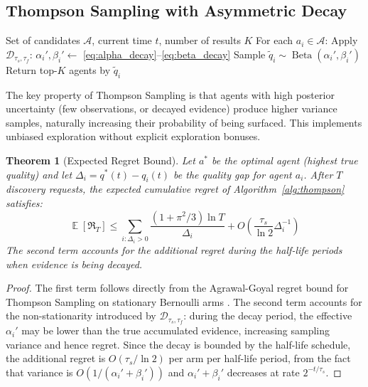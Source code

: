 \documentclass[conference]{IEEEtran}
\newtheorem{theorem}{Theorem}
\DeclareMathOperator{\E}{\mathbb{E}}
\DeclareMathOperator{\Beta}{\mathrm{Beta}}
\begin{document}
\subsection{Thompson Sampling with Asymmetric Decay}

\begin{algorithm}
\caption{ArohaRep Discovery Ranking}
\label{alg:thompson}
\begin{algorithmic}[1]
\Require Set of candidates $\mathcal{A}$, current time $t$,
         number of results $K$
\State For each $a_i \in \mathcal{A}$:
\State \quad Apply $\mathcal{D}_{\tau_s,\tau_f}$:
       $\alpha_i', \beta_i' \leftarrow$
       \eqref{eq:alpha_decay}--\eqref{eq:beta_decay}
\State \quad Sample $\tilde{q}_i \sim \Beta(\alpha_i', \beta_i')$
\State Return top-$K$ agents by $\tilde{q}_i$
\end{algorithmic}
\end{algorithm}

The key property of Thompson Sampling is that agents with
high posterior uncertainty (few observations, or decayed
evidence) produce higher variance samples, naturally
increasing their probability of being surfaced. This
implements unbiased exploration without explicit exploration
bonuses.

\begin{theorem}[Expected Regret Bound]
\label{thm:regret}
Let $a^*$ be the optimal agent (highest true quality) and
let $\Delta_i = q^*(t) - q_i(t)$ be the quality gap for
agent $a_i$. After $T$ discovery requests, the expected
cumulative regret of Algorithm~\ref{alg:thompson} satisfies:
\begin{equation}
  \E\!\left[\mathfrak{R}_T\right] \leq
    \sum_{i: \Delta_i > 0}
    \frac{(1 + \pi^2/3)\ln T}{\Delta_i}
    + O\!\left(\frac{\tau_s}{\ln 2} \Delta_i^{-1}\right)
  \label{eq:regret}
\end{equation}
The second term accounts for the additional regret during
the half-life periods when evidence is being decayed.
\end{theorem}
\begin{proof}
The first term follows directly from the Agrawal-Goyal
regret bound for Thompson Sampling on stationary Bernoulli
arms \cite{agrawal2012analysis}. The second term accounts for
the non-stationarity introduced by $\mathcal{D}_{\tau_s,\tau_f}$:
during the decay period, the effective $\alpha_i'$ may be
lower than the true accumulated evidence, increasing sampling
variance and hence regret. Since the decay is bounded by the
half-life schedule, the additional regret is $O(\tau_s / \ln
2)$ per arm per half-life period, from the fact that
variance is $O(1 / (\alpha_i' + \beta_i'))$ and
$\alpha_i' + \beta_i'$ decreases at rate $2^{-t/\tau_s}$.
\end{proof}
\end{document}
